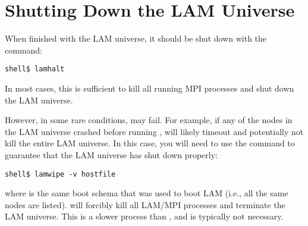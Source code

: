 
\section{Shutting Down the LAM Universe}
\label{sec:getting-started-lamhalt}

When finished with the LAM universe, it should be shut down with the
 command:

\lstset{style=lam-cmdline}
\begin{lstlisting}
shell$ lamhalt
\end{lstlisting}

In most cases, this is sufficient to kill all running MPI processes
and shut down the LAM universe.

However, in some rare conditions,  may fail.  For
example, if any of the nodes in the LAM universe crashed before
running ,  will likely timeout and
potentially not kill the entire LAM universe.  In this case, you will
need to use the  command to guarantee that the LAM
universe has shut down properly:

\lstset{style=lam-cmdline}
\begin{lstlisting}
shell$ lamwipe -v hostfile
\end{lstlisting}

\noindent where  is the same boot schema that was used to
boot LAM (i.e., all the same nodes are listed).   will
forcibly kill all LAM/MPI processes and terminate the LAM universe.
This is a slower process than , and is typically not
necessary.

